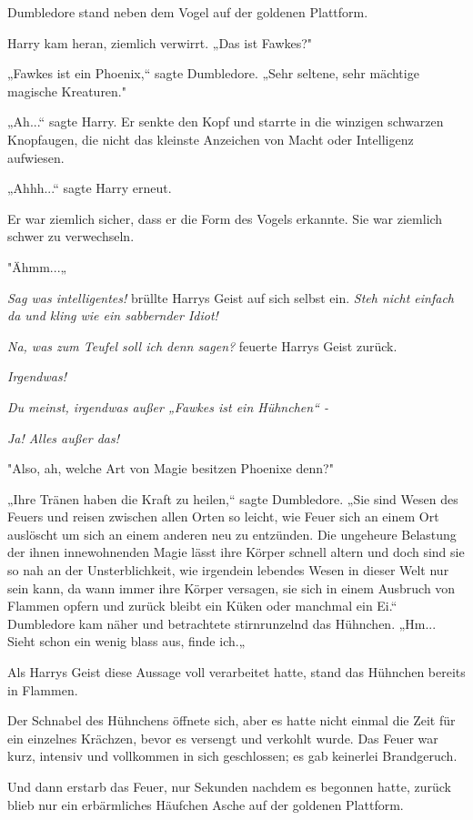{Dumbledore stand neben dem Vogel auf der goldenen Plattform.

Harry kam heran, ziemlich verwirrt. „Das ist Fawkes?"

„Fawkes ist ein Phoenix,“ sagte Dumbledore. „Sehr seltene, sehr mächtige magische Kreaturen."

„Ah...“ sagte Harry. Er senkte den Kopf und starrte in die winzigen schwarzen Knopfaugen, die nicht das kleinste Anzeichen von Macht oder Intelligenz aufwiesen.

„Ahhh...“ sagte Harry erneut.

Er war ziemlich sicher, dass er die Form des Vogels erkannte. Sie war ziemlich schwer zu verwechseln.

"Ähmm...„

\emph{Sag was intelligentes!} brüllte Harrys Geist auf sich selbst ein. \emph{Steh nicht einfach da und kling wie ein sabbernder Idiot!}

\emph{Na, was zum Teufel soll ich denn sagen?} feuerte Harrys Geist zurück.

\emph{Irgendwas!}

\emph{Du meinst, irgendwas außer „Fawkes ist ein Hühnchen“ -}

\emph{Ja! Alles außer das!}

"Also, ah, welche Art von Magie besitzen Phoenixe denn?"

„Ihre Tränen haben die Kraft zu heilen,“ sagte Dumbledore. „Sie sind Wesen des Feuers und reisen zwischen allen Orten so leicht, wie Feuer sich an einem Ort auslöscht um sich an einem anderen neu zu entzünden. Die ungeheure Belastung der ihnen innewohnenden Magie lässt ihre Körper schnell altern und doch sind sie so nah an der Unsterblichkeit, wie irgendein lebendes Wesen in dieser Welt nur sein kann, da wann immer ihre Körper versagen, sie sich in einem Ausbruch von Flammen opfern und zurück bleibt ein Küken oder manchmal ein Ei.“ Dumbledore kam näher und betrachtete stirnrunzelnd das Hühnchen. „Hm... Sieht schon ein wenig blass aus, finde ich.„

Als Harrys Geist diese Aussage voll verarbeitet hatte, stand das Hühnchen bereits in Flammen.

Der Schnabel des Hühnchens öffnete sich, aber es hatte nicht einmal die Zeit für ein einzelnes Krächzen, bevor es versengt und verkohlt wurde. Das Feuer war kurz, intensiv und vollkommen in sich geschlossen; es gab keinerlei Brandgeruch.

Und dann erstarb das Feuer, nur Sekunden nachdem es begonnen hatte, zurück blieb nur ein erbärmliches Häufchen Asche auf der goldenen Plattform.

}
